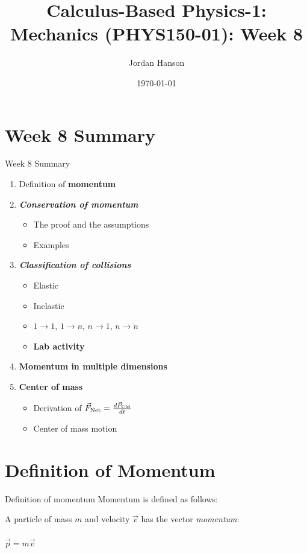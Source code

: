 \documentclass{beamer}
\title{Calculus-Based Physics-1: Mechanics (PHYS150-01): Week 8}
\date{\today}
\author{Jordan Hanson}
\institute{Whittier College Department of Physics and Astronomy}
\begin{document}
\maketitle

\section{Week 8 Summary}

\begin{frame}{Week 8 Summary}
\begin{enumerate}
\item Definition of \alert{\textbf{momentum}}
\item \alert{\textbf{\textit{Conservation of momentum}}}
\begin{itemize}
\item The proof and the assumptions
\item Examples
\end{itemize}
\item \alert{\textbf{\textit{Classification of collisions}}}
\begin{itemize}
\item Elastic
\item Inelastic
\item $1 \rightarrow 1$, $1 \rightarrow n$, $n \rightarrow 1$, $n \rightarrow n$
\item \textbf{Lab activity}
\end{itemize}
\item \textbf{Momentum in multiple dimensions}
\item \textbf{Center of mass}
\begin{itemize}
\item Derivation of $\vec{F}_{\rm Net} = \frac{d\vec{P}_{\rm CM}}{dt}$
\item Center of mass motion
\end{itemize}
\end{enumerate}
\end{frame}

\section{Definition of Momentum}

\begin{frame}{Definition of momentum}
Momentum is defined as follows: \\ \vspace{1cm}
\begin{tcolorbox}[colback=white,colframe=red!40!blue,title=Definition of Momentum]
\alert{A particle of mass $m$ and velocity $\vec{v}$ has the vector \textit{momentum}:} \\ \\
\alert{$\vec{p} = m\vec{v}$}
\end{tcolorbox}
\end{frame}
\end{document}
